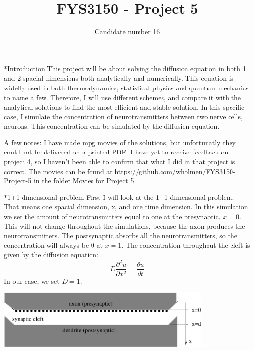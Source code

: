\documentclass[a4paper, 12pt, titlepage]{article}
\author{Candidate number 16}
\title{FYS3150 - Project 5}
\newcommand{\beq}{\begin{equation*}}
\newcommand{\eeq}{\end{equation*}}
\newcommand{\pa}{\partial}
\begin{document}
 \maketitle
 \newpage
 
 \begin{section}*{Introduction}
  This project will be about solving the diffusion equation in both 1 and 2 spacial dimensions both 
  analytically and numerically. This equation is widelly used in both thermodynamics, statistical physics and
  quantum mechanics to name a few. Therefore, I will use different schemes, and compare it with the analytical
  solutions to find the most efficient and stable solution. In this specific case, I simulate
  the concentration of neurotransmitters between two nerve cells, neurons. This concentration can be simulated
  by the diffusion equation. 
  
  A few notes: I have made mpg movies of the solutions, but unfortunatly they could not be delivered on a 
  printed PDF. I have yet to receive feedback on project 4, so I haven't been able to confirm that what I did
  in that project is correct. The movies can be found at https://github.com/wholmen/FYS3150-Project-5 in
  the folder Movies for Project 5.
 \end{section}

 \begin{section}*{1+1 dimensional problem}
  First I will look at the 1+1 dimensional problem. That means one spacial dimension, x, and one time 
  dimension. In this simulation we set the amount of neurotransmitters equal to one at the presynaptic,
  $x=0$. This will not change throughout the simulations, because the axon produces the neurotransmitters.
  The postsynaptic absorbs all the neurotransmitters, so the concentration will always be 0 at $x=1$. 
  The concentration throughout the cleft is given by the diffusion equation:
  \beq D\frac{\pa^2 u}{\pa x^2} = \frac{\pa u}{\pa t} \eeq
  In our case, we set $D=1$. 
 
  \includegraphics[width=0.8\textwidth]{build-main-Desktop-Debug/synaptic_cleft.eps}{\centering}
 
 \end{section} 
 
\end{document}
